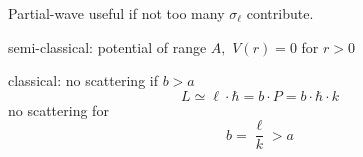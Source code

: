 Partial-wave useful if not too many $\sigma_{\ell}$ contribute.

semi-classical: potential of range $A,$ $V(r)=0$ for $r>0$

classical: no scattering if $b>a$
\begin{dmath}[]
	L\simeq \ell\cdot \hbar=b\cdot P=b\cdot \hbar\cdot k
\end{dmath}
no scattering for
\begin{dmath}[]
	b=\frac{\ell}{k}>a
\end{dmath}
